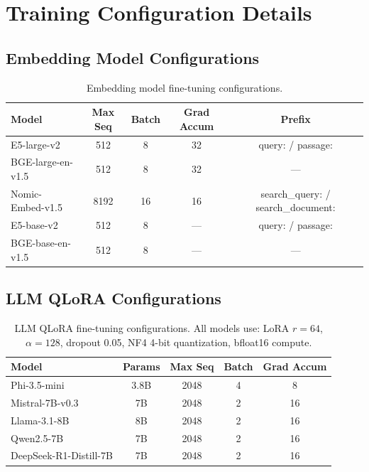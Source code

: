 \documentclass[11pt]{article}
\begin{document}
\section{Training Configuration Details}
\label{app:training}

\subsection{Embedding Model Configurations}

\begin{table}[h]
\caption{Embedding model fine-tuning configurations.}
\centering
\small
\begin{tabular}{lcccc}
\toprule
\textbf{Model} & \textbf{Max Seq} & \textbf{Batch} & \textbf{Grad Accum} & \textbf{Prefix} \\
\midrule
E5-large-v2 & 512 & 8 & 32 & query: / passage: \\
BGE-large-en-v1.5 & 512 & 8 & 32 & --- \\
Nomic-Embed-v1.5 & 8192 & 16 & 16 & search\_query: / search\_document: \\
E5-base-v2 & 512 & 8 & --- & query: / passage: \\
BGE-base-en-v1.5 & 512 & 8 & --- & --- \\
\bottomrule
\end{tabular}
\end{table}

\subsection{LLM QLoRA Configurations}

\begin{table}[h]
\caption{LLM QLoRA fine-tuning configurations. All models use: LoRA $r=64$, $\alpha=128$, dropout 0.05, NF4 4-bit quantization, bfloat16 compute.}
\centering
\small
\begin{tabular}{lcccc}
\toprule
\textbf{Model} & \textbf{Params} & \textbf{Max Seq} & \textbf{Batch} & \textbf{Grad Accum} \\
\midrule
Phi-3.5-mini & 3.8B & 2048 & 4 & 8 \\
Mistral-7B-v0.3 & 7B & 2048 & 2 & 16 \\
Llama-3.1-8B & 8B & 2048 & 2 & 16 \\
Qwen2.5-7B & 7B & 2048 & 2 & 16 \\
DeepSeek-R1-Distill-7B & 7B & 2048 & 2 & 16 \\
\bottomrule
\end{tabular}
\end{table}
\end{document}
